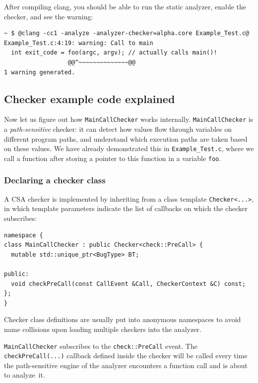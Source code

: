 \documentclass[a4paper,12pt]{article}
\newenvironment{nobr}{\begin{minipage}{\textwidth}\setlength\parskip{1em}
}{\end{minipage}\ignorespacesafterend}
\begin{document}
\begin{nobr}
After compiling clang, you should be able to run the static analyzer, enable the checker, and see the warning:
\begin{lstlisting}[style=commandline]
~ $ @clang -cc1 -analyze -analyzer-checker=alpha.core Example_Test.c@
Example_Test.c:4:19: warning: Call to main
  int exit_code = foo(argc, argv); // actually calls main()!
                  @@^~~~~~~~~~~~~~~@@
1 warning generated.
\end{lstlisting}
\end{nobr}

\subsection{Checker example code explained}\label{subsec:coding_intro}

Now let us figure out how \lstinline|MainCallChecker| works internally. \lstinline|MainCallChecker| is a \emph{path-sensitive} check\-er: it can detect how values flow through variables on different program paths, and understand which execution paths are taken based on these values. We have already demonstrated this in \lstinline|Example_Test.c|, where we call a function after storing a pointer to this function in a variable \lstinline|foo|.

\begin{nobr}
\subsubsection{Declaring a checker class}

A CSA checker is implemented by inheriting from a class template \lstinline|Checker<...>|, in which template parameters indicate the list of callbacks on which the checker subscribes:

\begin{lstlisting}[style=cplusplus,firstnumber=10]
namespace {
class MainCallChecker : public Checker<check::PreCall> {
  mutable std::unique_ptr<BugType> BT;

public:
  void checkPreCall(const CallEvent &Call, CheckerContext &C) const;
};
}
\end{lstlisting}
\end{nobr}

Checker class definitions are usually put into anonymous namespaces to avoid name collisions upon loading multiple checkers into the analyzer.

\lstinline|MainCallChecker| subscribes to the \lstinline|check::PreCall| event. The \lstinline|checkPreCall(...)| callback defined inside the checker will be called every time the path-sensitive engine of the analyzer encounters a function call and is about to analyze~it.
\end{document}
